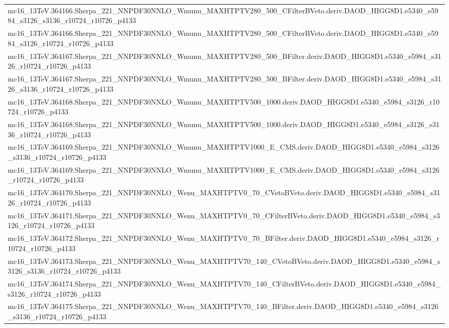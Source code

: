 \begin{adjustwidth}{-3em}{-3em}
\begin{longtable}{l}
mc16\_13TeV.364166.Sherpa\_221\_NNPDF30NNLO\_Wmunu\_MAXHTPTV280\_500\_CFilterBVeto.deriv.DAOD\_HIGG8D1.e5340\_e5984\_s3126\_s3136\_r10724\_r10726\_p4133 \\
mc16\_13TeV.364166.Sherpa\_221\_NNPDF30NNLO\_Wmunu\_MAXHTPTV280\_500\_CFilterBVeto.deriv.DAOD\_HIGG8D1.e5340\_e5984\_s3126\_r10724\_r10726\_p4133 \\
mc16\_13TeV.364167.Sherpa\_221\_NNPDF30NNLO\_Wmunu\_MAXHTPTV280\_500\_BFilter.deriv.DAOD\_HIGG8D1.e5340\_e5984\_s3126\_r10724\_r10726\_p4133 \\
mc16\_13TeV.364167.Sherpa\_221\_NNPDF30NNLO\_Wmunu\_MAXHTPTV280\_500\_BFilter.deriv.DAOD\_HIGG8D1.e5340\_e5984\_s3126\_s3136\_r10724\_r10726\_p4133 \\
mc16\_13TeV.364168.Sherpa\_221\_NNPDF30NNLO\_Wmunu\_MAXHTPTV500\_1000.deriv.DAOD\_HIGG8D1.e5340\_e5984\_s3126\_r10724\_r10726\_p4133 \\
mc16\_13TeV.364168.Sherpa\_221\_NNPDF30NNLO\_Wmunu\_MAXHTPTV500\_1000.deriv.DAOD\_HIGG8D1.e5340\_e5984\_s3126\_s3136\_r10724\_r10726\_p4133 \\
mc16\_13TeV.364169.Sherpa\_221\_NNPDF30NNLO\_Wmunu\_MAXHTPTV1000\_E\_CMS.deriv.DAOD\_HIGG8D1.e5340\_e5984\_s3126\_s3136\_r10724\_r10726\_p4133 \\
mc16\_13TeV.364169.Sherpa\_221\_NNPDF30NNLO\_Wmunu\_MAXHTPTV1000\_E\_CMS.deriv.DAOD\_HIGG8D1.e5340\_e5984\_s3126\_r10724\_r10726\_p4133 \\
mc16\_13TeV.364170.Sherpa\_221\_NNPDF30NNLO\_Wenu\_MAXHTPTV0\_70\_CVetoBVeto.deriv.DAOD\_HIGG8D1.e5340\_e5984\_s3126\_r10724\_r10726\_p4133 \\
mc16\_13TeV.364171.Sherpa\_221\_NNPDF30NNLO\_Wenu\_MAXHTPTV0\_70\_CFilterBVeto.deriv.DAOD\_HIGG8D1.e5340\_e5984\_s3126\_r10724\_r10726\_p4133 \\
mc16\_13TeV.364172.Sherpa\_221\_NNPDF30NNLO\_Wenu\_MAXHTPTV0\_70\_BFilter.deriv.DAOD\_HIGG8D1.e5340\_e5984\_s3126\_r10724\_r10726\_p4133 \\
mc16\_13TeV.364173.Sherpa\_221\_NNPDF30NNLO\_Wenu\_MAXHTPTV70\_140\_CVetoBVeto.deriv.DAOD\_HIGG8D1.e5340\_e5984\_s3126\_s3136\_r10724\_r10726\_p4133 \\
mc16\_13TeV.364174.Sherpa\_221\_NNPDF30NNLO\_Wenu\_MAXHTPTV70\_140\_CFilterBVeto.deriv.DAOD\_HIGG8D1.e5340\_e5984\_s3126\_r10724\_r10726\_p4133 \\
mc16\_13TeV.364175.Sherpa\_221\_NNPDF30NNLO\_Wenu\_MAXHTPTV70\_140\_BFilter.deriv.DAOD\_HIGG8D1.e5340\_e5984\_s3126\_s3136\_r10724\_r10726\_p4133 \\

\end{longtable}
\end{adjustwidth}
